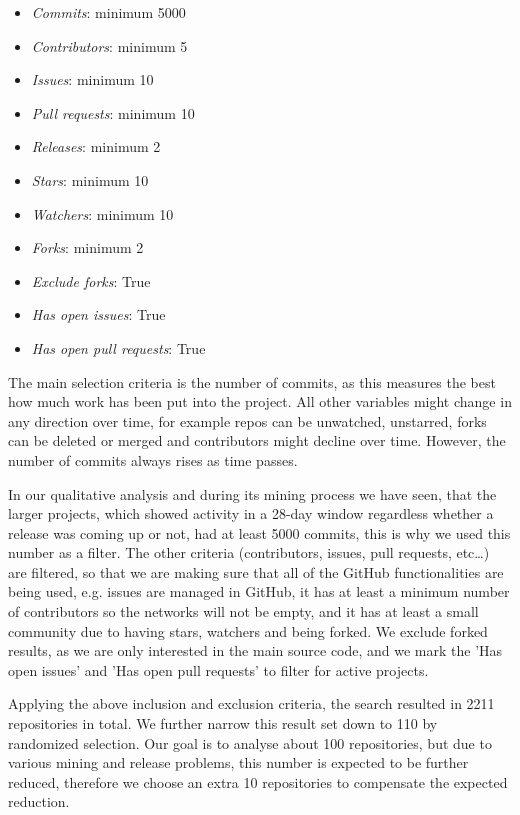 \begin{itemize}
    \item \textit{Commits}: minimum 5000
    \item \textit{Contributors}: minimum 5
    \item \textit{Issues}: minimum 10
    \item \textit{Pull requests}: minimum 10
    \item \textit{Releases}: minimum 2
    \item \textit{Stars}: minimum 10
    \item \textit{Watchers}: minimum 10
    \item \textit{Forks}: minimum 2
    \item \textit{Exclude forks}: True
    \item \textit{Has open issues}: True
    \item \textit{Has open pull requests}: True
\end{itemize}

The main selection criteria is the number of commits, as this measures the best how much work has been put into the project. All other variables might change in any direction over time, for example repos can be unwatched, unstarred, forks can be deleted or merged and contributors might decline over time. However, the number of commits always rises as time passes.

In our qualitative analysis and during its mining process we have seen, that the larger projects, which showed activity in a 28-day window regardless whether a release was coming up or not, had at least 5000 commits, this is why we used this number as a filter. The other criteria (contributors, issues, pull requests, etc\dots) are filtered, so that we are making sure that all of the GitHub functionalities are being used, e.g. issues are managed in GitHub, it has at least a minimum number of contributors so the networks will not be empty, and it has at least a small community due to having stars, watchers and being forked. We exclude forked results, as we are only interested in the main source code, and we mark the 'Has open issues' and 'Has open pull requests' to filter for active projects.

Applying the above inclusion and exclusion criteria, the search resulted in 2211 repositories in total. We further narrow this result set down to 110 by randomized selection. Our goal is to analyse about 100 repositories, but due to various mining and release problems, this number is expected to be further reduced, therefore we choose an extra 10 repositories to compensate the expected reduction.

